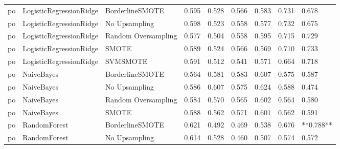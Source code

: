 \begin{tabular}{lllllllll}
      po &      LogisticRegressionRidge &     BorderlineSMOTE & 0.595 &                     0.528 &                 0.566 &                  0.583 &                                   0.731 &     0.678 \\
      po &      LogisticRegressionRidge &       No Upsampling & 0.598 &                     0.523 &                 0.558 &                  0.577 &                                   0.732 &     0.675 \\
      po &      LogisticRegressionRidge & Random Oversampling & 0.577 &                     0.504 &                 0.558 &                  0.595 &                                   0.715 &     0.729 \\
      po &      LogisticRegressionRidge &               SMOTE & 0.589 &                     0.524 &                 0.566 &                  0.569 &                                   0.710 &     0.733 \\
      po &      LogisticRegressionRidge &            SVMSMOTE & 0.591 &                     0.512 &                 0.541 &                  0.571 &                                   0.664 &     0.718 \\
      po &                   NaiveBayes &     BorderlineSMOTE & 0.564 &                     0.581 &                 0.583 &                  0.607 &                                   0.575 &     0.587 \\
      po &                   NaiveBayes &       No Upsampling & 0.586 &                     0.607 &                 0.575 &                  0.624 &                                   0.588 &     0.474 \\
      po &                   NaiveBayes & Random Oversampling & 0.584 &                     0.570 &                 0.565 &                  0.602 &                                   0.564 &     0.580 \\
      po &                   NaiveBayes &               SMOTE & 0.588 &                     0.562 &                 0.571 &                  0.601 &                                   0.562 &     0.591 \\
      po &                 RandomForest &     BorderlineSMOTE & 0.621 &                     0.492 &                 0.469 &                  0.538 &                                   0.676 & **0.788** \\
      po &                 RandomForest &       No Upsampling & 0.614 &                     0.528 &                 0.460 &                  0.507 &                                   0.574 &     0.572 \\

\end{tabular}
